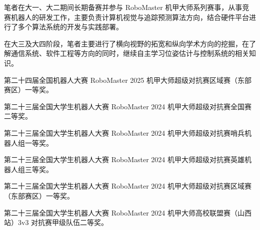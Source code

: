
\begin{resume}


笔者在大一、大二期间长期备赛并参与 RoboMaster 机甲大师系列赛事，从事竞赛机器人的研发工作，主要负责计算机视觉与追踪预测算法方向，结合硬件平台进行了多个算法系统的开发与实践部署。

在大三及大四阶段，笔者主要进行了横向视野的拓宽和纵向学术方向的挖掘，在了解通信系统、软件工程等方向的同时，继续自主学习位姿估计与控制系统的相关知识。



  \begin{publications}
    \item 第二十四届全国机器人大赛 RoboMaster 2025 机甲大师超级对抗赛区域赛（东部赛区）一等奖。
    \item 第二十三届全国大学生机器人大赛 RoboMaster 2024 机甲大师超级对抗赛全国赛二等奖。
    \item 第二十三届全国大学生机器人大赛 RoboMaster 2024 机甲大师超级对抗赛哨兵机器人组一等奖。
    \item 第二十三届全国大学生机器人大赛 RoboMaster 2024 机甲大师超级对抗赛英雄机器人组三等奖。
    \item 第二十三届全国大学生机器人大赛 RoboMaster 2024 机甲大师超级对抗赛区域赛（东部赛区）一等奖。
    \item 第二十三届全国大学生机器人大赛 RoboMaster 2024 机甲大师高校联盟赛（山西站）3v3 对抗赛甲级队伍二等奖。
  \end{publications}

\end{resume}